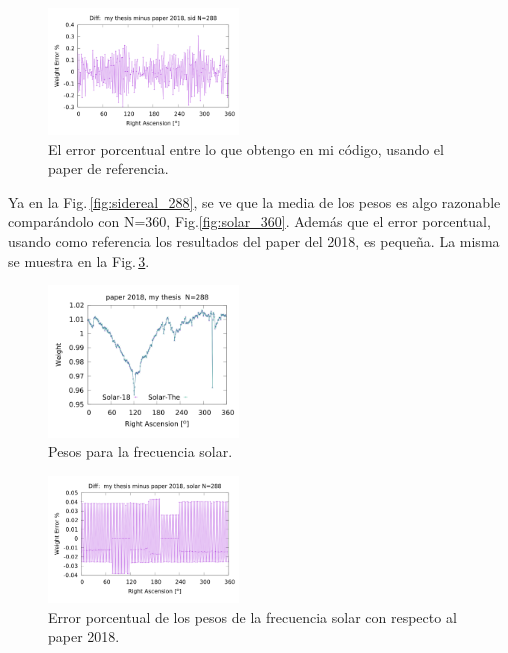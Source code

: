 \begin{figure}[H]
	\centering
	\includegraphics[width=0.45\textwidth]{sidereal_my_and_paper_in_288_error.png}
	\caption{El error porcentual entre lo que obtengo en mi código, usando el paper de referencia.}
	\label{fig:error_288_sidereal}
\end{figure}


Ya en la Fig.\,\ref{fig:sidereal_288}, se ve que la media de los pesos es algo razonable comparándolo con N=360, Fig.\ref{fig:solar_360}. Además que el error porcentual, usando como referencia los resultados del paper del 2018, es pequeña. La misma se muestra en la Fig.\,\ref{fig:error_288_solar}.

\begin{figure}[H]
	\centering
	\includegraphics[width=0.45\textwidth]{solar_my_and_paper_2018_in_288.png}
	\caption{Pesos para la frecuencia solar.}
	\label{fig:solar_288}
\end{figure}


\begin{figure}[H]
	\centering
	\includegraphics[width=0.45\textwidth]{solar_my_and_paper_in_288_error.png}
	\caption{Error porcentual de los pesos de la frecuencia solar con respecto al paper 2018.}
	\label{fig:error_288_solar}
\end{figure}

